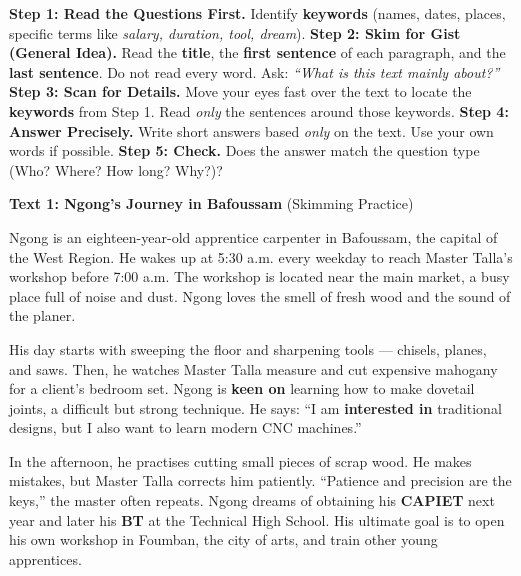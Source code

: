 \documentclass[11pt]{article}
\begin{document}
\begin{methode}
\textbf{Step 1: Read the Questions First.} Identify \textbf{keywords} (names, dates, places, specific terms like \emph{salary, duration, tool, dream}).
\textbf{Step 2: Skim for Gist (General Idea).} Read the \textbf{title}, the \textbf{first sentence} of each paragraph, and the \textbf{last sentence}. Do not read every word. Ask: \emph{``What is this text mainly about?''}
\textbf{Step 3: Scan for Details.} Move your eyes fast over the text to locate the \textbf{keywords} from Step 1. Read \emph{only} the sentences around those keywords.
\textbf{Step 4: Answer Precisely.} Write short answers based \emph{only} on the text. Use your own words if possible.
\textbf{Step 5: Check.} Does the answer match the question type (Who? Where? How long? Why?)?
\end{methode}

\textbf{Text 1: Ngong's Journey in Bafoussam} \hfill (Skimming Practice)

\begin{exemplebox}
Ngong is an eighteen-year-old apprentice carpenter in Bafoussam, the capital of the West Region. He wakes up at 5:30 a.m. every weekday to reach Master Talla's workshop before 7:00 a.m. The workshop is located near the main market, a busy place full of noise and dust. Ngong loves the smell of fresh wood and the sound of the planer.

His day starts with sweeping the floor and sharpening tools --- chisels, planes, and saws. Then, he watches Master Talla measure and cut expensive mahogany for a client's bedroom set. Ngong is \textbf{keen on} learning how to make dovetail joints, a difficult but strong technique. He says: ``I am \textbf{interested in} traditional designs, but I also want to learn modern CNC machines.''

In the afternoon, he practises cutting small pieces of scrap wood. He makes mistakes, but Master Talla corrects him patiently. ``Patience and precision are the keys,'' the master often repeats. Ngong dreams of obtaining his \textbf{CAPIET} next year and later his \textbf{BT} at the Technical High School. His ultimate goal is to open his own workshop in Foumban, the city of arts, and train other young apprentices.
\end{exemplebox}
\end{document}
